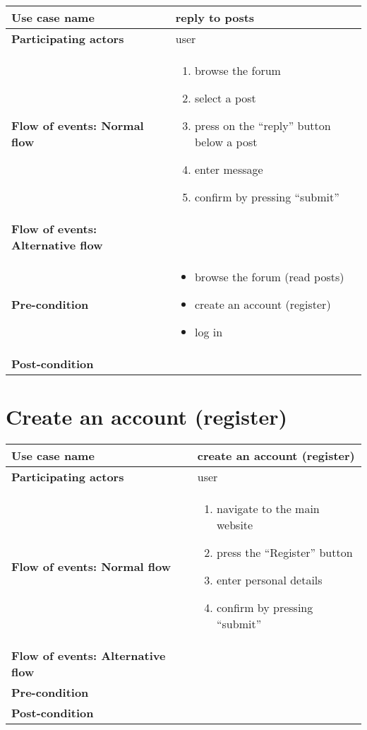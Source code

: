 \documentclass[a4paper, 13pt, draft]{report}
\begin{document}
\begin{center}
    \begin{tabular}{| >{\bf}l | p{5.55cm} |} 
	\hline
	Use case name & reply to posts \\ 
	\hline
	Participating actors & user \\
	\hline
	Flow of events: Normal flow & 
	\begin{enumerate}		
	    \item browse the forum
	    \item select a post
	    \item press on the ``reply'' button below a post
	    \item enter message
	    \item confirm by pressing ``submit''
	\end{enumerate}	\\
	\hline
	Flow of events: Alternative flow & \notapplicable \\
	\hline
	Pre-condition & 
	\begin{itemize} 
	    \item browse the forum (read posts)
	    \item create an account (register)
	    \item log in
	\end{itemize} \\
	\hline
	Post-condition & \notapplicable \\
	\hline
    \end{tabular}
\end{center}

\section*{Create an account (register)}

\begin{center}
    \begin{tabular}{| >{\bf}l | p{5.55cm} |} 
	\hline
	Use case name & create an account (register) \\ 
	\hline
	Participating actors & user \\
	\hline
	Flow of events: Normal flow & 
	\begin{enumerate}		
	    \item navigate to the main website
	    \item press the ``Register'' button
	    \item enter personal details
	    \item confirm by pressing ``submit''
	\end{enumerate}	\\
	\hline
	Flow of events: Alternative flow & \notapplicable \\
	\hline
	Pre-condition & \notapplicable \\
	\hline
	Post-condition & \notapplicable \\
	\hline
    \end{tabular}
\end{center}
\end{document}
